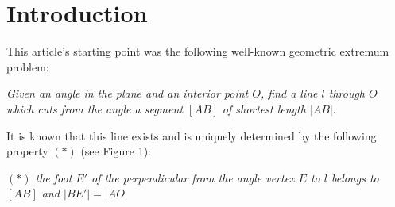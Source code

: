 \documentclass[a4paper,12pt]{amsart}
\begin{document}
\begin{abstract}
Let $\partial \,\mathcal{C}$ be the boundary of a compact convex body $\mathcal{C}$ in $\mathbb{R}^n,\, n\geq 2$, and $O$ be an interior point of $\mathcal C$. Every straight line $l$ containing $O$  cuts from $\mathcal{C}$ a segment $[AB]$ with end-points on $\partial \,\mathcal{C}$. It is shown that if $[AB]$  is the shortest such segment, then $\partial \,\mathcal{C}$ is smooth at the points $A$ and $ B$ (i.e. at both of them there is only one supporting hyperplane for $\mathcal{C}$) and, something more, the normals to the unique supporting hyperplanes at the points $A$ and $B$ intersect at a point belonging to the hiperplane through $O$ which is orthogonal to $[AB]$.

If $\mathcal{C}$ is a smooth  compact convex body in          $\mathbb{R}^n,\, n\geq 2$, the above property holds also when $[AB]$ is the longest such segment. Similar results have place also when $O$ is outside the set $\mathcal{C}$.
The ``local versions'' of these results (when the length $|AB|$ of the segment $[AB]$ is locally maximal or locally minimal) also have a place. More specific results are obtained in the particular case when $\mathcal{C}$ is a convex polytope.

\end{abstract}


\maketitle

\section{Introduction}\label{si}

This article's starting point was the following well-known geometric extremum problem:

\smallskip

\emph{Given an angle in the plane and an interior point $O$, find
a line $l$ through $O$  which cuts from the angle a segment $[AB]$
of shortest length $|AB|$}.

\smallskip

It is known that this line exists and is uniquely determined by the following property  $(*)$ (see Figure 1):

\smallskip

\emph{ $(*)$ the foot  $E'$ of the perpendicular from the angle
vertex $E$  to $l$ belongs to $ [AB]$ and $|BE'| = |AO|$}
\end{document}
